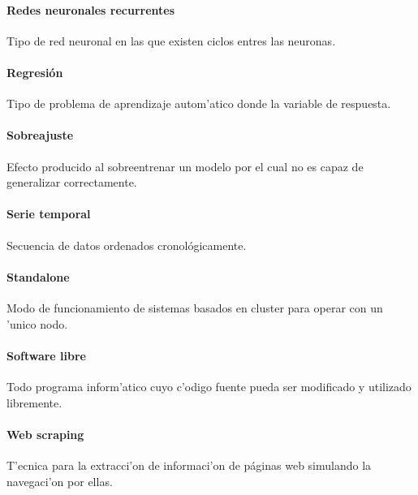 \paragraph*{Redes neuronales recurrentes} Tipo de red neuronal en las que existen ciclos entres las neuronas.
\paragraph*{Regresión} Tipo de problema de aprendizaje autom'atico donde la variable de respuesta.
\paragraph*{Sobreajuste} Efecto producido al sobreentrenar un modelo por el cual no es capaz de generalizar correctamente.
\paragraph*{Serie temporal} Secuencia de datos ordenados cronológicamente.
\paragraph*{Standalone} Modo de funcionamiento de sistemas basados en cluster para operar con un 'unico nodo.
\paragraph*{Software libre} Todo programa inform'atico cuyo c'odigo fuente pueda ser modificado y utilizado libremente.
\paragraph*{Web scraping} T'ecnica para la extracci'on de informaci'on de páginas web simulando la navegaci'on por ellas.



 


\clearpage
